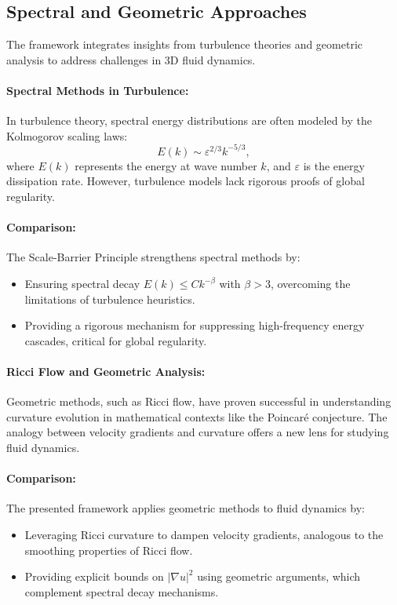 \documentclass[12pt]{article}
\theoremstyle{definition}
\begin{document}
\subsection{Spectral and Geometric Approaches}

The framework integrates insights from turbulence theories and geometric analysis to address challenges in 3D fluid dynamics.

\paragraph{Spectral Methods in Turbulence:}
In turbulence theory, spectral energy distributions are often modeled by the Kolmogorov scaling laws:
\begin{equation}
E(k) \sim \varepsilon^{2/3} k^{-5/3},
\end{equation}
where $E(k)$ represents the energy at wave number $k$, and $\varepsilon$ is the energy dissipation rate. However, turbulence models lack rigorous proofs of global regularity.

\paragraph{Comparison:}
The Scale-Barrier Principle strengthens spectral methods by:
\begin{itemize}
    \item Ensuring spectral decay $E(k) \leq C k^{-\beta}$ with $\beta > 3$, overcoming the limitations of turbulence heuristics.
    \item Providing a rigorous mechanism for suppressing high-frequency energy cascades, critical for global regularity.
\end{itemize}

\paragraph{Ricci Flow and Geometric Analysis:}
Geometric methods, such as Ricci flow, have proven successful in understanding curvature evolution in mathematical contexts like the Poincar\'e conjecture. The analogy between velocity gradients and curvature offers a new lens for studying fluid dynamics.

\paragraph{Comparison:}
The presented framework applies geometric methods to fluid dynamics by:
\begin{itemize}
    \item Leveraging Ricci curvature to dampen velocity gradients, analogous to the smoothing properties of Ricci flow.
    \item Providing explicit bounds on $|\nabla u|^2$ using geometric arguments, which complement spectral decay mechanisms.
\end{itemize}
\end{document}
